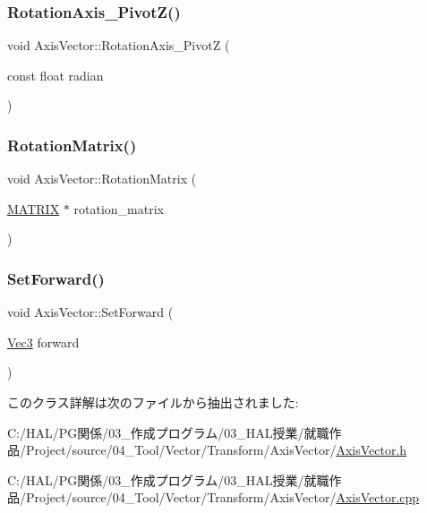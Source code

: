 \mbox{\label{class_axis_vector_adde5b636a046a4fe6c5c943646045843}} 
\subsubsection{\texorpdfstring{Rotation\+Axis\+\_\+\+Pivot\+Z()}{RotationAxis\_PivotZ()}}
{\footnotesize\ttfamily void Axis\+Vector\+::\+Rotation\+Axis\+\_\+\+PivotZ (\begin{DoxyParamCaption}\item[{const float}]{radian }\end{DoxyParamCaption})}

\mbox{\label{class_axis_vector_a33aab769ff2de997393c13414fa23873}} 
\subsubsection{\texorpdfstring{Rotation\+Matrix()}{RotationMatrix()}}
{\footnotesize\ttfamily void Axis\+Vector\+::\+Rotation\+Matrix (\begin{DoxyParamCaption}\item[{\mbox{\hyperlink{_vector3_d_8h_a032295cd9fb1b711757c90667278e744}{M\+A\+T\+R\+IX}} $\ast$}]{rotation\+\_\+matrix }\end{DoxyParamCaption})}

\mbox{\label{class_axis_vector_ac429404c0b565c24307da4442e49bb61}} 
\subsubsection{\texorpdfstring{Set\+Forward()}{SetForward()}}
{\footnotesize\ttfamily void Axis\+Vector\+::\+Set\+Forward (\begin{DoxyParamCaption}\item[{\mbox{\hyperlink{_vector3_d_8h_ab16f59e4393f29a01ec8b9bbbabbe65d}{Vec3}}}]{forward }\end{DoxyParamCaption})}



このクラス詳解は次のファイルから抽出されました\+:\begin{DoxyCompactItemize}
\item 
C\+:/\+H\+A\+L/\+P\+G関係/03\+\_\+作成プログラム/03\+\_\+\+H\+A\+L授業/就職作品/\+Project/source/04\+\_\+\+Tool/\+Vector/\+Transform/\+Axis\+Vector/\mbox{\hyperlink{_axis_vector_8h}{Axis\+Vector.\+h}}\item 
C\+:/\+H\+A\+L/\+P\+G関係/03\+\_\+作成プログラム/03\+\_\+\+H\+A\+L授業/就職作品/\+Project/source/04\+\_\+\+Tool/\+Vector/\+Transform/\+Axis\+Vector/\mbox{\hyperlink{_axis_vector_8cpp}{Axis\+Vector.\+cpp}}\end{DoxyCompactItemize}
